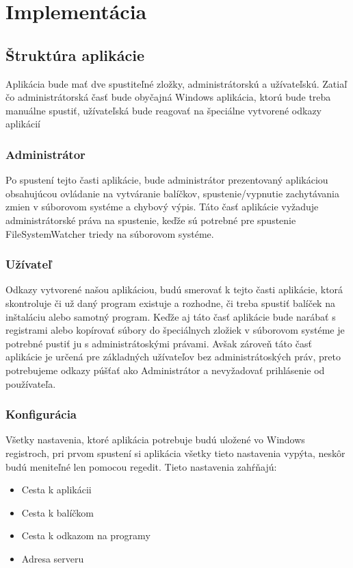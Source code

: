 \chapter{Implementácia}

\section{Štruktúra aplikácie}

Aplikácia bude mať dve spustiteľné zložky, administrátorskú a užívateľskú. Zatiaľ čo administrátorská časť bude obyčajná Windows aplikácia, ktorú bude treba manuálne spustiť, užívateľská bude reagovať na špeciálne vytvorené odkazy aplikácií
\subsection{Administrátor}
Po spustení tejto časti aplikácie, bude administrátor prezentovaný aplikáciou obsahujúcou ovládanie na vytváranie balíčkov, spustenie/vypnutie zachytávania zmien v súborovom systéme a chybový výpis. Táto časť aplikácie vyžaduje administrátorské práva na spustenie, keďže sú potrebné pre spustenie FileSystemWatcher triedy na súborovom systéme.
\subsection{Užívateľ}
Odkazy vytvorené našou aplikáciou, budú smerovať k tejto časti aplikácie, ktorá skontroluje či už daný program existuje a rozhodne, či treba spustiť balíček na inštaláciu alebo samotný program. Keďže aj táto časť aplikácie bude narábať s registrami alebo kopírovať súbory do špeciálnych zložiek v súborovom systéme je potrebné pustiť ju s administrátoskými právami. Avšak zároveň táto časť aplikácie je určená pre základných užívateľov bez administrátoských práv, preto potrebujeme odkazy púšťať ako Administrátor a nevyžadovať prihlásenie od používateľa.
\subsection{Konfigurácia}
Všetky nastavenia, ktoré aplikácia potrebuje budú uložené vo Windows registroch, pri prvom spustení si aplikácia všetky tieto nastavenia vypýta, neskôr budú meniteľné len pomocou regedit. Tieto nastavenia zahŕňajú:

\begin{itemize}
\item Cesta k aplikácii
\item Cesta k balíčkom
\item Cesta k odkazom na programy
\item Adresa serveru
\end{itemize}

